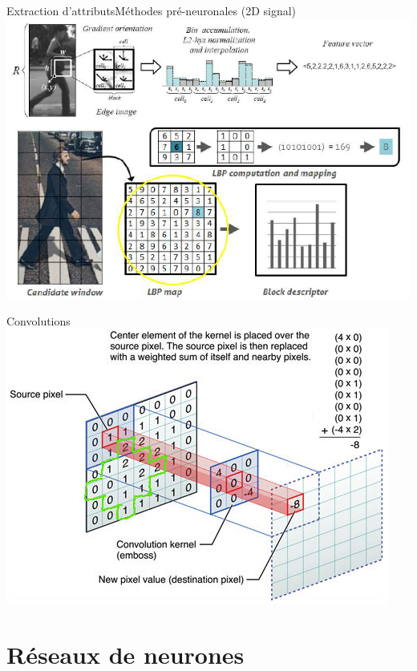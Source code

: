 \documentclass[compress]{beamer}
\begin{document}
\begin{frame}{Extraction d'attributs}{Méthodes pré-neuronales (2D signal)}
\centering
\includegraphics[width=0.9\linewidth]{resources/beatles}
\end{frame}

\begin{frame}{Convolutions}
	\centering
	\includegraphics[width=0.9\linewidth]{resources/clem/convolution}
\end{frame}

\section{Réseaux de neurones}
\end{document}
